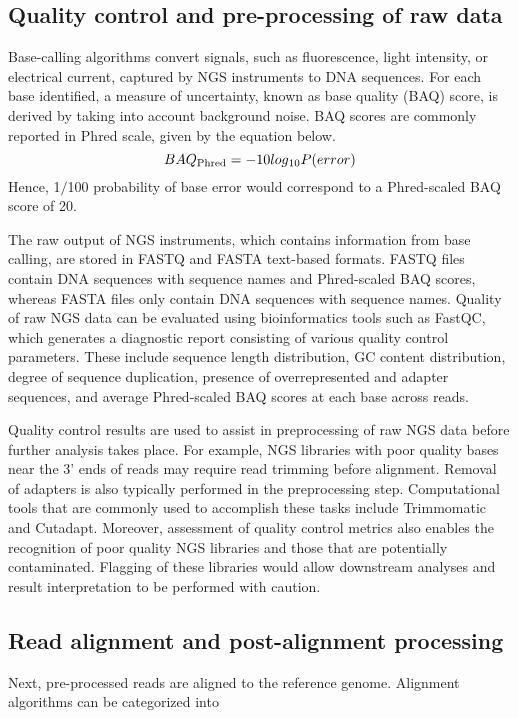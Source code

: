 \subsection{Quality control and pre-processing of raw data}

Base-calling algorithms convert signals, such as fluorescence, light intensity, or electrical current, captured by NGS instruments to DNA sequences. For each base identified, a measure of uncertainty, known as base quality (BAQ) score, is derived by taking into account background noise. BAQ scores are commonly reported in Phred scale, given by the equation below. $$BAQ\textsubscript{Phred} = -10log\textsubscript{10}P(error)$$ Hence, 1$/$100 probability of base error would correspond to a Phred-scaled BAQ score of 20.

The raw output of NGS instruments, which contains information from base calling, are stored in FASTQ and FASTA text-based formats. FASTQ files contain DNA sequences with sequence names and Phred-scaled BAQ scores, whereas FASTA files only contain DNA sequences with sequence names. Quality of raw NGS data can be evaluated using bioinformatics tools such as FastQC, which generates a diagnostic report consisting of various quality control parameters. These include sequence length distribution, GC content distribution, degree of sequence duplication, presence of overrepresented and adapter sequences, and average Phred-scaled BAQ scores at each base across reads.

Quality control results are used to assist in preprocessing of raw NGS data before further analysis takes place. For example, NGS libraries with poor quality bases near the 3' ends of reads may require read trimming before alignment. Removal of adapters is also typically performed in the preprocessing step. Computational tools that are commonly used to accomplish these tasks include Trimmomatic and Cutadapt. Moreover, assessment of quality control metrics also enables the recognition of poor quality NGS libraries and those that are potentially contaminated. Flagging of these libraries would allow downstream analyses and result interpretation to be performed with caution.

\subsection{Read alignment and post-alignment processing}

Next, pre-processed reads are aligned to the reference genome. Alignment algorithms can be categorized into

